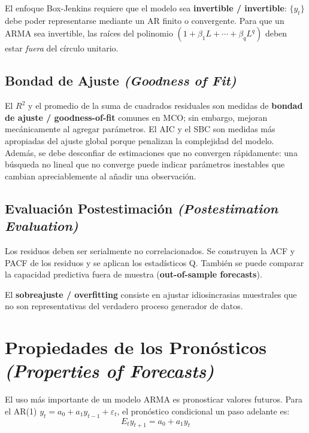 \documentclass[12pt]{article}
\begin{document}
El enfoque Box-Jenkins requiere que el modelo sea \textbf{invertible / invertible}: $\{y_t\}$ debe poder representarse mediante un AR finito o convergente. Para que un ARMA sea invertible, las ra\'ices del polinomio $(1 + \beta_1 L + \cdots + \beta_q L^q)$ deben estar \textit{fuera} del c\'irculo unitario.

\subsection{Bondad de Ajuste \textit{(Goodness of Fit)}}

El $R^2$ y el promedio de la suma de cuadrados residuales son medidas de \textbf{bondad de ajuste / goodness-of-fit} comunes en MCO; sin embargo, mejoran mec\'anicamente al agregar par\'ametros. El AIC y el SBC son medidas m\'as apropiadas del ajuste global porque penalizan la complejidad del modelo. Adem\'as, se debe desconfiar de estimaciones que no convergen r\'apidamente: una b\'usqueda no lineal que no converge puede indicar par\'ametros inestables que cambian apreciablemente al a\~nadir una observaci\'on.

\subsection{Evaluaci\'on Postestimaci\'on \textit{(Postestimation Evaluation)}}

Los residuos deben ser serialmente no correlacionados. Se construyen la ACF y PACF de los residuos y se aplican los estad\'isticos Q. Tambi\'en se puede comparar la capacidad predictiva fuera de muestra (\textbf{out-of-sample forecasts}).

El \textbf{sobreajuste / overfitting} consiste en ajustar idiosincrasias muestrales que no son representativas del verdadero proceso generador de datos.

\section{Propiedades de los Pron\'osticos \textit{(Properties of Forecasts)}}

El uso m\'as importante de un modelo ARMA es pronosticar valores futuros. Para el AR(1) $y_t = a_0 + a_1 y_{t-1} + \varepsilon_t$, el pron\'ostico condicional un paso adelante es:
\begin{equation}
E_t y_{t+1} = a_0 + a_1 y_t
\end{equation}
\end{document}

